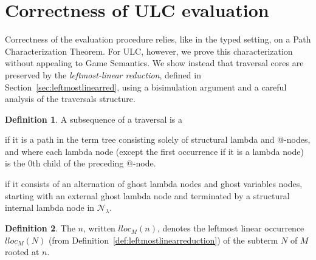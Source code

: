\documentclass{elsarticle}
\makeatletter
\theoremstyle{plain}
\theoremstyle{definition}
\newtheorem{definition}{Definition}[section]
\newcommand\Nodes{\mathcal{N}}%
\newcommand\NodesLmd{\Nodes_\lambda}%
\renewcommand\ie{{\it i.e.\@\xspace}}
\makeatother
\begin{document}
\section{Correctness of ULC evaluation}
\label{sec:correctness_ulc_normalization}
Correctness of the evaluation procedure relies, like in the typed setting, on a Path Characterization Theorem.
For ULC, however, we prove this characterization without appealing to Game Semantics.
We show instead that traversal cores are preserved by the \emph{leftmost-linear reduction}, defined in Section~\ref{sec:leftmostlinearred}, using a bisimulation argument and a careful analysis of the traversals structure.

\begin{definition}
    \label{def:spinaldescent_pendingarglookup}
A subsequence of a traversal is a
\begin{enumerate*}[nosep,label=(\roman*)]
\item {} if it is a path in the term tree consisting solely of structural lambda and $@$-nodes, and where each lambda node (except the first occurrence if it is a lambda node) is the $0$th child of the preceding $@$-node.
\item {} if it consists of an alternation of ghost lambda nodes and ghost variables nodes, starting with an external ghost lambda node and terminated by a structural internal lambda node in $\NodesLmd$.
\end{enumerate*}
\end{definition}

\begin{definition}
The  $n$, written
 $lloc_M(n)$, denotes the leftmost linear occurrence $lloc_M(N)$ (from Definition~\ref{def:leftmostlinearreduction}) of the subterm $N$ of $M$ rooted at $n$.
\end{definition}
\end{document}

